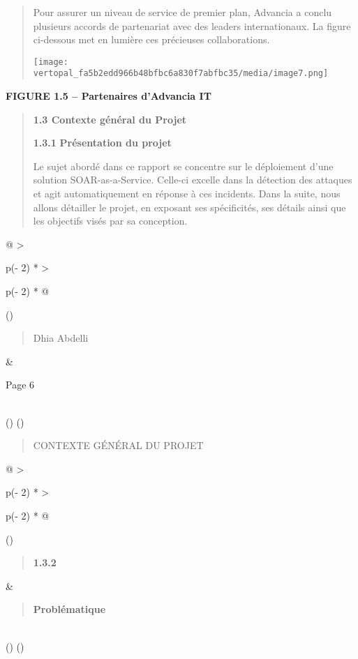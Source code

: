 \documentclass[
]{article}
\begin{document}
\begin{quote}
Pour assurer un niveau de service de premier plan, Advancia a conclu
plusieurs accords de partenariat avec des leaders internationaux. La
figure ci-dessous met en lumière ces précieuses collaborations.

\texttt{[image: vertopal\_fa5b2edd966b48bfbc6a830f7abfbc35/media/image7.png]}
\end{quote}

\textbf{FIGURE 1.5 -- Partenaires d'Advancia IT}

\begin{quote}
\textbf{1.3 Contexte général du Projet}

\textbf{1.3.1} \textbf{Présentation du projet}

Le sujet abordé dans ce rapport se concentre sur le déploiement d'une
solution SOAR-as-a-Service. Celle-ci excelle dans la détection des
attaques et agit automatiquement en réponse à ces incidents. Dans la
suite, nous allons détailler le projet, en exposant ses spécificités,
ses détails ainsi que les objectifs visés par sa conception.
\end{quote}

\begin{longtable}[]{@{}
  >{\raggedright\arraybackslash}p{(\columnwidth - 2\tabcolsep) * }
  >{\raggedright\arraybackslash}p{(\columnwidth - 2\tabcolsep) * }@{}}
\toprule()
\begin{minipage}[b]{\linewidth}\raggedright
\begin{quote}
Dhia Abdelli
\end{quote}
\end{minipage} & \begin{minipage}[b]{\linewidth}\raggedright
Page 6
\end{minipage} \\
\midrule()
\endhead
\bottomrule()
\end{longtable}

\begin{quote}
CONTEXTE GÉNÉRAL DU PROJET
\end{quote}

\begin{longtable}[]{@{}
  >{\raggedright\arraybackslash}p{(\columnwidth - 2\tabcolsep) * }
  >{\raggedright\arraybackslash}p{(\columnwidth - 2\tabcolsep) * }@{}}
\toprule()
\begin{minipage}[b]{\linewidth}\raggedright
\begin{quote}
\textbf{1.3.2}
\end{quote}
\end{minipage} & \begin{minipage}[b]{\linewidth}\raggedright
\begin{quote}
\textbf{Problématique}
\end{quote}
\end{minipage} \\
\midrule()
\endhead
\bottomrule()
\end{longtable}
\end{document}

